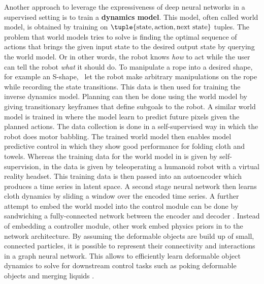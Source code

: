 \documentclass[\home/main.tex]{subfiles}
\begin{document}
Another approach to leverage the expressiveness of deep neural networks in a supervised setting is to train a \textbf{dynamics model}. This model, often called world model, is obtained by training on $\tuple{\text{state}, \text{action}, \text{next state}}$ tuples. The problem that world models tries to solve is finding the optimal sequence of actions that brings the given input state to the desired output state by querying the world model. Or in other words, the robot knows \textit{how} to act while the user can tell the robot \textit{what} it should do. To manipulate a rope into a desired shape, for example an S-shape,~\textcite{Nair2017} let the robot make arbitrary manipulations on the rope while recording the state transitions. This data is then used for training the inverse dynamics model. Planning can then be done using the world model by giving transitionary keyframes that define subgoals to the robot. A similar world model is trained in \autocite{Ebert2018} where the model learn to predict future pixels given the planned actions. The data collection is done in a self-supervised way in which the robot does motor babbling. The trained world model then enables model predictive control in which they show good performance for folding cloth and towels. Whereas the training data for the world model in \autocite{Nair2017} is given by self-supervision, in \autocite{Yang2016} the data is given by teleoperating a humanoid robot with a virtual reality headset. This training data is then passed into an autoencoder which produces a time series in latent space. A second stage neural network then learns cloth dynamics by sliding a window over the encoded time series. A further attempt to embed the world model into the control module can be done by sandwiching a fully-connected network between the encoder and decoder \autocite{Tanaka2018}. Instead of embedding a controller module, other work embed physics priors in to the network architecture. By assuming the deformable objects are build up of small, connected particles, it is possible to represent their connectivity and interactions in a graph neural network. This allows to efficiently learn deformable object dynamics to solve for downstream control tasks such as poking deformable objects \autocite{Mrowca2018} and merging liquids \autocite{Li2018}.

\end{document}
